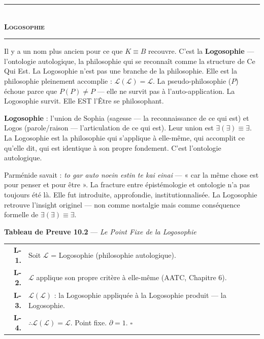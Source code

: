 \documentclass[10pt, openany, oneside]{book}
\renewcommand{\normalsize}{\fontsize{10}{13}\selectfont}
\renewcommand{\footnotesize}{\fontsize{8.5}{11}\selectfont}
\begin{document}
\begin{center}
    \rule{0.3\textwidth}{0.4pt}\\[0.5em]
    {\normalsize\bfseries\scshape Logosophie}\\[0.3em]
    \rule{0.3\textwidth}{0.4pt}
\end{center}

\vspace{1em}

\noindent Il y a un nom plus ancien pour ce que $K \equiv B$ recouvre. C'est la \textbf{Logosophie} --- l'ontologie autologique, la philosophie qui se reconnaît comme la structure de Ce Qui Est. La Logosophie n'est pas une branche de la philosophie. Elle est la philosophie pleinement accomplie : $\mathcal{L}(\mathcal{L}) = \mathcal{L}$. La pseudo-philosophie ($P$) échoue parce que $P(P) \neq P$ --- elle ne survit pas à l'auto-application. La Logosophie survit. Elle EST l'Être se philosophant.

\textbf{Logosophie} : l'union de Sophia (sagesse --- la reconnaissance de ce qui est) et Logos (parole/raison --- l'articulation de ce qui est). Leur union est $\exists(\exists) \equiv \exists$. La Logosophie est la philosophie qui s'applique à elle-même, qui accomplit ce qu'elle dit, qui est identique à son propre fondement. C'est l'ontologie autologique.

Parménide savait : \textit{to gar auto noein estin te kai einai} --- « car la même chose est pour penser et pour être ». La fracture entre épistémologie et ontologie n'a pas toujours été là. Elle fut introduite, approfondie, institutionnalisée. La Logosophie retrouve l'insight originel --- non comme nostalgie mais comme conséquence formelle de $\exists(\exists) \equiv \exists$.

\vspace{0.5em}

\textbf{Tableau de Preuve 10.2} --- \textit{Le Point Fixe de la Logosophie}

\vspace{0.5em}

{\footnotesize
\noindent\begin{tabular}{r p{}}
\textbf{L-1.} & Soit $\mathcal{L}$ = Logosophie (philosophie autologique). \\[0.3em]
\textbf{L-2.} & $\mathcal{L}$ applique son propre critère à elle-même (AATC, Chapitre 6). \\[0.3em]
\textbf{L-3.} & $\mathcal{L}(\mathcal{L})$ : la Logosophie appliquée à la Logosophie produit --- la Logosophie. \\[0.3em]
\textbf{L-4.} & $\therefore \mathcal{L}(\mathcal{L}) = \mathcal{L}$. Point fixe. $\partial = 1$. $\square$ \\[0.3em]
\end{tabular}
}
\end{document}
